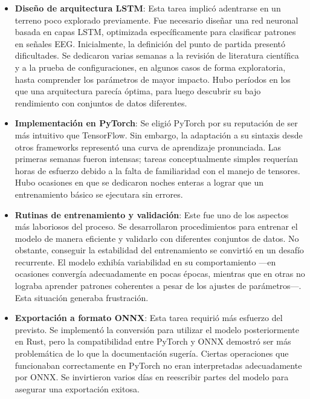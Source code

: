 \begin{itemize}
    \item \textbf{Diseño de arquitectura LSTM}: Esta tarea implicó adentrarse en un terreno poco explorado previamente. Fue necesario diseñar una red neuronal basada en capas LSTM, optimizada específicamente para clasificar patrones en señales EEG. Inicialmente, la definición del punto de partida presentó dificultades. Se dedicaron varias semanas a la revisión de literatura científica y a la prueba de configuraciones, en algunos casos de forma exploratoria, hasta comprender los parámetros de mayor impacto. Hubo períodos en los que una arquitectura parecía óptima, para luego descubrir su bajo rendimiento con conjuntos de datos diferentes.
    
    \item \textbf{Implementación en PyTorch}: Se eligió PyTorch por su reputación de ser más intuitivo que TensorFlow. Sin embargo, la adaptación a su sintaxis desde otros frameworks representó una curva de aprendizaje pronunciada. Las primeras semanas fueron intensas; tareas conceptualmente simples requerían horas de esfuerzo debido a la falta de familiaridad con el manejo de tensores. Hubo ocasiones en que se dedicaron noches enteras a lograr que un entrenamiento básico se ejecutara sin errores.
    
    \item \textbf{Rutinas de entrenamiento y validación}: Este fue uno de los aspectos más laboriosos del proceso. Se desarrollaron procedimientos para entrenar el modelo de manera eficiente y validarlo con diferentes conjuntos de datos. No obstante, conseguir la estabilidad del entrenamiento se convirtió en un desafío recurrente. El modelo exhibía variabilidad en su comportamiento —en ocasiones convergía adecuadamente en pocas épocas, mientras que en otras no lograba aprender patrones coherentes a pesar de los ajustes de parámetros—. Esta situación generaba frustración.
    
    \item \textbf{Exportación a formato ONNX}: Esta tarea requirió más esfuerzo del previsto. Se implementó la conversión para utilizar el modelo posteriormente en Rust, pero la compatibilidad entre PyTorch y ONNX demostró ser más problemática de lo que la documentación sugería. Ciertas operaciones que funcionaban correctamente en PyTorch no eran interpretadas adecuadamente por ONNX. Se invirtieron varios días en reescribir partes del modelo para asegurar una exportación exitosa.
\end{itemize}

